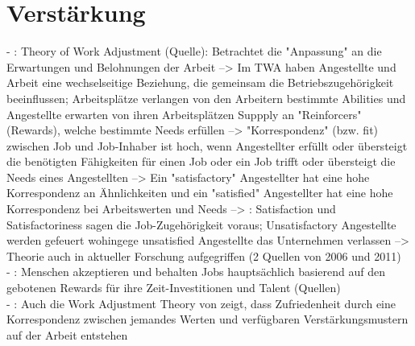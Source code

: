\section{Verstärkung}
\label{ch:personEnvironmentFit:verstaerkung}
- \cite[S. 3]{su:2015}: Theory of Work Adjustment (Quelle): Betrachtet die "Anpassung" an die Erwartungen und Belohnungen der Arbeit --> Im TWA haben Angestellte und Arbeit eine wechselseitige Beziehung, die gemeinsam die Betriebszugehörigkeit beeinflussen; Arbeitsplätze verlangen von den Arbeitern bestimmte Abilities und Angestellte erwarten von ihren Arbeitsplätzen Suppply an "Reinforcers" (Rewards), welche bestimmte Needs erfüllen --> "Korrespondenz" (bzw. fit) zwischen Job und Job-Inhaber ist hoch, wenn Angestellter erfüllt oder übersteigt die benötigten Fähigkeiten für einen Job oder ein Job trifft oder übersteigt die Needs eines Angestellten --> Ein "satisfactory" Angestellter hat eine hohe Korrespondenz an Ähnlichkeiten und ein "satisfied" Angestellter hat eine hohe Korrespondenz bei Arbeitswerten und Needs --> \cite[S. 4]{su:2015}: Satisfaction und Satisfactoriness sagen die Job-Zugehörigkeit voraus; Unsatisfactory Angestellte werden gefeuert wohingege unsatisfied Angestellte das Unternehmen verlassen --> Theorie auch in aktueller Forschung aufgegriffen (2 Quellen von 2006 und 2011) \\
- \cite[S. 3]{edwards:2004}: Menschen akzeptieren und behalten Jobs hauptsächlich basierend auf den gebotenen Rewards für ihre Zeit-Investitionen und Talent (Quellen) \\
- \cite[S. 3]{edwards:1990}: Auch die Work Adjustment Theory von \textcite{workAdjustment:1964} zeigt, dass Zufriedenheit durch eine Korrespondenz zwischen jemandes Werten und verfügbaren Verstärkungsmustern auf der Arbeit entstehen \\

